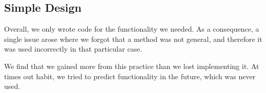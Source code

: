 \subsection{Simple Design}
Overall, we only wrote code for the functionality we needed. As a consequence, a single issue arose where we forgot that a method was not general, and therefore it was used incorrectly in that particular case. 

We find that we gained more from this practice than we lost implementing it. At times out habit, we tried to predict functionality in the future, which was never used.